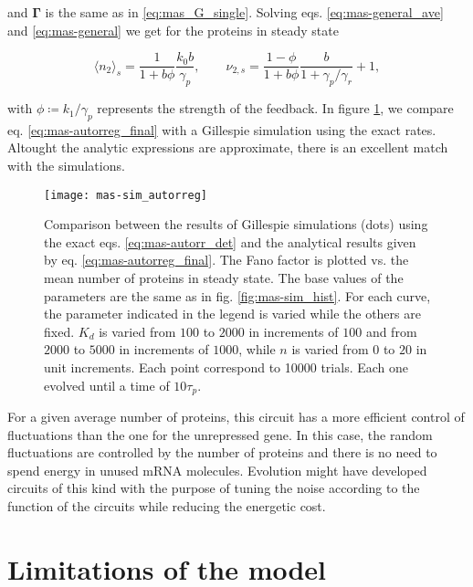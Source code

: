 and $\mathbf{\Gamma}$ is the same as in \eqref{eq:mas_G_single}. Solving eqs. \eqref{eq:mas-general_ave} and \eqref{eq:mas-general} we get for the proteins in steady state

\begin{equation}
  \label{eq:mas-autorreg_final}
  \langle n_2\rangle_s = \frac{1}{1+b\phi}\frac{k_0b}{\gamma_p},\quad\quad \nu_{2,s} = \frac{1-\phi}{1+b\phi}\frac{b}{1+\gamma_p/\gamma_r}+1,
\end{equation}

with $\phi\coloneqq k_1/\gamma_p$ represents the strength of the feedback. In figure \ref{fig:mas-sim_autorreg}, we compare eq. \eqref{eq:mas-autorreg_final}  with a Gillespie simulation using the exact rates. Altought the analytic expressions are approximate, there is an excellent match with the simulations.

\begin{figure}[H]
  \centering
  \texttt{[image: mas-sim\_autorreg]}
  \caption[Fano factor of protein number for a negatively autorregulated gene]{\label{fig:mas-sim_autorreg} Comparison between the results of Gillespie simulations (dots) using the exact eqs. \eqref{eq:mas-autorr_det} and the analytical results given by eq. \eqref{eq:mas-autorreg_final}. The Fano factor is plotted vs. the mean number of proteins in steady state. The base values of the parameters are the same as in fig. \ref{fig:mas-sim_hist}. For each curve, the parameter indicated in the legend is varied while the others are fixed. $K_d$ is varied from $100$ to $2000$ in increments of $100$ and from $2000$ to $5000$ in increments of $1000$, while $n$ is varied from $0$ to $20$ in unit increments. Each point correspond to 10000 trials. Each one evolved until a time of $10\tau_p$.}
\end{figure}

For a given average number of proteins, this circuit has a more efficient control of fluctuations than the one for the unrepressed gene. In this case, the random fluctuations are controlled by the number of proteins and there is no need to spend energy in unused mRNA molecules. Evolution might have developed circuits of this kind with the purpose of tuning the noise according to the function of the circuits while reducing the energetic cost.

\section{Limitations of the model}

